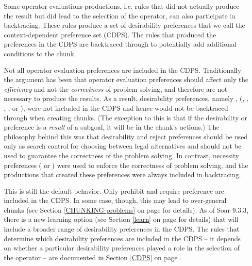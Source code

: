 Some operator evaluations productions, i.e. rules that did not actually produce
the result but did lead to the selection of the operator, can also participate
in backtracing.  These rules produce a set of desirability preferences that we
call the context-dependent preference set (CDPS).  The rules that produced the
preferences in the CDPS are backtraced through to potentially add additional
conditions to the chunk.

Not all operator evaluation preferences are included in the CDPS.
Traditionally the argument has been that operator evaluation preferences should
affect only the \emph{efficiency} and not the \emph{correctness} of problem
solving, and therefore are not necessary to produce the results. As a result,
desirability preferences, namely , (,
, , , or ), were not included
in the CDPS and hence would not be backtraced through when creating chunks. (The
exception to this is that if the desirability or  preference is a
{\em result} of a subgoal, it will be in the chunk's actions.) The philosophy
behind this was that desirability and reject preferences should be used only as
search control for choosing between legal alternatives and should not be used to
guarantee the correctness of the problem solving. In contrast, necessity
preferences ( or ) were used to enforce the
correctness of problem solving, and the productions that created these
preferences were always included in backtracing.

This is still the default behavior.  Only prohibit and require preference are
included in the CDPS. In some case, though, this may lead to over-general chunks
(see Section \ref{CHUNKING-problems} on page \pageref{CHUNKING-problems} for
details).  As of Soar 9.3.3, there is a new learning option (see Section
\ref{learn} on page \pageref{learn} for details) that will include a broader
range of desirability preferences in the CDPS. The rules
that determine which desirability preferences are included in the CDPS -- it
depends on whether a particular desirability preferences played a
role in the selection of the operator -- are documented in
Section \ref{CDPS} on page \pageref{CDPS}.

